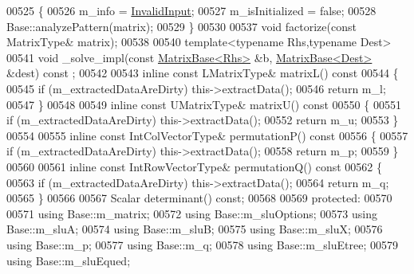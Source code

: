 \begin{DoxyCode}
00525     \{
00526       m\_info = \hyperlink{group__enums_gga85fad7b87587764e5cf6b513a9e0ee5ea945604f62795ffc70aedf2bd12ea0434}{InvalidInput};
00527       m\_isInitialized = \textcolor{keyword}{false};
00528       Base::analyzePattern(matrix);
00529     \}
00530     
00537     \textcolor{keywordtype}{void} factorize(\textcolor{keyword}{const} MatrixType& matrix);
00538     
00540     \textcolor{keyword}{template}<\textcolor{keyword}{typename} Rhs,\textcolor{keyword}{typename} Dest>
00541     \textcolor{keywordtype}{void} \_solve\_impl(\textcolor{keyword}{const} \hyperlink{group___core___module_class_eigen_1_1_matrix_base}{MatrixBase<Rhs>} &b, \hyperlink{group___core___module_class_eigen_1_1_matrix_base}{MatrixBase<Dest>} &dest) \textcolor{keyword}{const}
      ;
00542     
00543     \textcolor{keyword}{inline} \textcolor{keyword}{const} LMatrixType& matrixL()\textcolor{keyword}{ const}
00544 \textcolor{keyword}{    }\{
00545       \textcolor{keywordflow}{if} (m\_extractedDataAreDirty) this->extractData();
00546       \textcolor{keywordflow}{return} m\_l;
00547     \}
00548 
00549     \textcolor{keyword}{inline} \textcolor{keyword}{const} UMatrixType& matrixU()\textcolor{keyword}{ const}
00550 \textcolor{keyword}{    }\{
00551       \textcolor{keywordflow}{if} (m\_extractedDataAreDirty) this->extractData();
00552       \textcolor{keywordflow}{return} m\_u;
00553     \}
00554 
00555     \textcolor{keyword}{inline} \textcolor{keyword}{const} IntColVectorType& permutationP()\textcolor{keyword}{ const}
00556 \textcolor{keyword}{    }\{
00557       \textcolor{keywordflow}{if} (m\_extractedDataAreDirty) this->extractData();
00558       \textcolor{keywordflow}{return} m\_p;
00559     \}
00560 
00561     \textcolor{keyword}{inline} \textcolor{keyword}{const} IntRowVectorType& permutationQ()\textcolor{keyword}{ const}
00562 \textcolor{keyword}{    }\{
00563       \textcolor{keywordflow}{if} (m\_extractedDataAreDirty) this->extractData();
00564       \textcolor{keywordflow}{return} m\_q;
00565     \}
00566     
00567     Scalar determinant() \textcolor{keyword}{const};
00568     
00569   \textcolor{keyword}{protected}:
00570     
00571     \textcolor{keyword}{using} Base::m\_matrix;
00572     \textcolor{keyword}{using} Base::m\_sluOptions;
00573     \textcolor{keyword}{using} Base::m\_sluA;
00574     \textcolor{keyword}{using} Base::m\_sluB;
00575     \textcolor{keyword}{using} Base::m\_sluX;
00576     \textcolor{keyword}{using} Base::m\_p;
00577     \textcolor{keyword}{using} Base::m\_q;
00578     \textcolor{keyword}{using} Base::m\_sluEtree;
00579     \textcolor{keyword}{using} Base::m\_sluEqued;

\end{DoxyCode}

